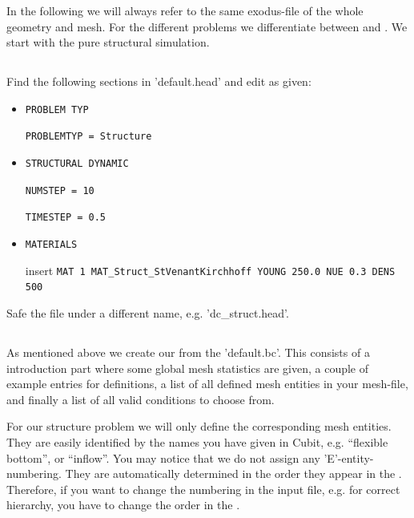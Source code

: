 In the following we will always refer to the same exodus-file of the whole
geometry and mesh. For the different problems we differentiate between \head and
\bc. We start with the pure structural simulation.

\subsection{\head}
Find the following sections in 'default.head' and edit as given:

\begin{itemize}
 \item \verb|PROBLEM TYP|

 \verb|PROBLEMTYP = Structure|
 \item \verb|STRUCTURAL DYNAMIC|

 \verb|NUMSTEP = 10|

 \verb|TIMESTEP = 0.5|

 \item \verb|MATERIALS|

  insert \verb|MAT 1 MAT_Struct_StVenantKirchhoff YOUNG 250.0 NUE 0.3 DENS 500|
 
\end{itemize}
Safe the file under a different name, e.g. 'dc\_struct.head'.


\subsection{\bc}
As mentioned above we create our \bc from the 'default.bc'. This consists of a
introduction part where some global mesh statistics are given, a couple of
example entries for definitions, a list of all defined mesh entities in
your mesh-file, and finally a list of all valid \baci{} conditions to choose
from.

For our structure problem we will only define the corresponding mesh entities. They are easily identified by the names you have given in Cubit, e.g. ``flexible bottom'', or ``inflow''. You may notice that we do not assign any 'E'-entity-numbering.
They are automatically determined in the order they appear in the \bc. Therefore, if you want to change the numbering in the \baci{} input file, e.g. for correct hierarchy, you have to change the order in the \bc.

